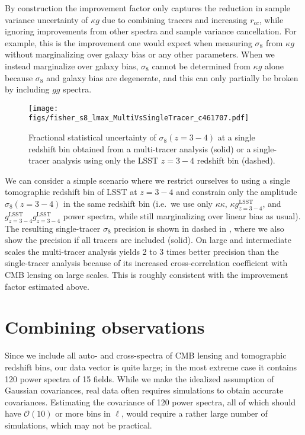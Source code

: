 \documentclass[prd,superscriptaddress,floatfix,notitlepage,nofootinbib,reprint]{revtex4-1} %
\begin{document}
By construction the improvement factor only captures the reduction in sample variance uncertainty of $\kappa g$ due to combining tracers and increasing $r_{cc}$, while ignoring improvements from other spectra and sample variance cancellation.
For example, this is the improvement one would expect when measuring $\sigma_8$ from $\kappa g$ without marginalizing over galaxy bias or any other parameters.
When we instead marginalize over galaxy bias, $\sigma_8$ cannot be determined from $\kappa g$ alone because $\sigma_8$ and galaxy bias are degenerate, and this can only partially be broken by including $gg$ spectra.




\begin{figure}[tbp]
\texttt{[image: figs/fisher\_s8\_lmax\_MultiVsSingleTracer\_c461707.pdf]}
\caption{Fractional statistical uncertainty of $\sigma_8(z=3-4)$ at a single redshift bin obtained from a multi-tracer analysis (solid) or a single-tracer analysis using only the LSST $z=3-4$ redshift bin (dashed). 
}
\label{fig:s8_lmax_multivssingletracer}
\end{figure}

We can consider a simple scenario where we restrict ourselves to using a single tomographic redshift bin of LSST at $z=3-4$ and constrain only the amplitude $\sigma_8(z=3-4)$ in the same redshift bin (i.e.~we use only $\kappa\kappa$, $\kappa g^\mathrm{LSST}_{z=3-4}$, and $g^\mathrm{LSST}_{z=3-4}g^\mathrm{LSST}_{z=3-4}$ power spectra, while still marginalizing over linear bias as usual).
The resulting single-tracer $\sigma_8$ precision is shown in dashed in , where we also show the precision if all tracers are included (solid).
On large and intermediate scales the multi-tracer analysis yields 2 to 3 times better precision than the single-tracer analysis because of its increased cross-correlation coefficient with CMB lensing on large scales.
This is roughly consistent with the improvement factor estimated above.




\section{Combining observations}
\label{app:CombiningObs}

Since we include all auto- and cross-spectra of CMB lensing and tomographic redshift bins, our data vector is quite large; in the most extreme case it contains 120 power spectra of 15 fields.
While we make the idealized assumption of Gaussian covariances, real data often requires simulations to obtain accurate covariances.
Estimating the covariance of 120 power spectra, all of which should have $\mathcal{O}(10)$ or more bins in $\ell$, would require a rather large number of simulations, which may not be practical.
\end{document}
